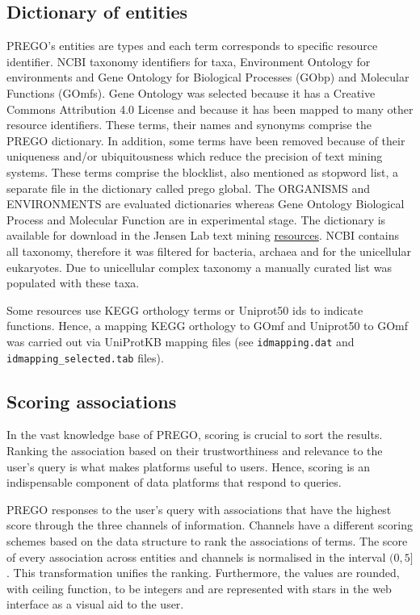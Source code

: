 \subsection{Dictionary of entities}
\label{subsec:prego-dict}

PREGO's entities are types and each term corresponds to specific resource identifier. 
NCBI taxonomy identifiers for taxa, Environment Ontology for environments and
Gene Ontology for Biological Processes (GObp) and Molecular Functions (GOmfs).
Gene Ontology was selected because it has a Creative Commons Attribution 4.0 License
and because it has been mapped to many other resource identifiers.
These terms, their names and synonyms comprise the PREGO dictionary. In addition,
some terms have been removed because of their uniqueness and/or ubiquitousness which reduce the precision of text mining systems.
These terms comprise the blocklist, also mentioned as stopword list, a separate file in the dictionary called prego global.
The ORGANISMS \parencite{pafilis2013species} and ENVIRONMENTS \parencite{pafilis2015environments} are evaluated dictionaries
whereas Gene Ontology Biological Process and Molecular Function are in experimental stage.
The dictionary is 
available for download in the Jensen Lab text mining \href{https://jensenlab.org/resources/textmining/#dictionaries}{resources}. 
NCBI contains all taxonomy, therefore it was filtered for bacteria, archaea and
for the unicellular eukaryotes. Due to unicellular complex taxonomy a manually curated
list was populated with these taxa.

Some resources use KEGG orthology terms or Uniprot50 ids to indicate functions. 
Hence, a mapping KEGG orthology to GOmf and Uniprot50 to GOmf was carried out via UniProtKB mapping files (see \texttt{idmapping.dat} and \texttt{idmapping\_selected.tab} files). 

\subsection{Scoring associations}
\label{scoring}

In the vast knowledge base of PREGO, scoring is crucial to sort 
the results. Ranking the association based on their trustworthiness and
relevance to the user's query is what makes platforms useful to users.
Hence, scoring is an indispensable component of data platforms 
that respond to queries.

PREGO responses to the user's query with associations that have the highest score
through the three channels of information. 
Channels have a different scoring schemes based on the data structure to
rank the associations of terms.
The score of every association across entities and channels is normalised in the interval $(0,5]$.
This transformation unifies the ranking.
Furthermore, the values are rounded, with ceiling function, to be integers
and are represented with stars in the web interface as a visual aid to the user.

